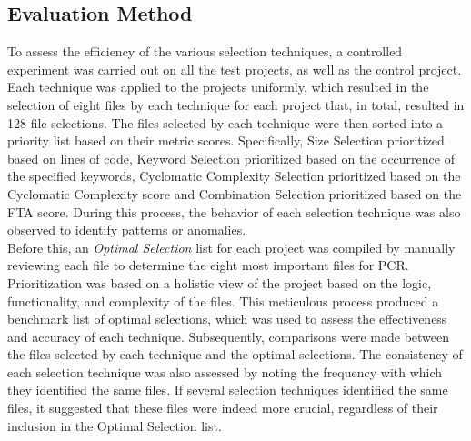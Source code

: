 \subsection{Evaluation Method}
To assess the efficiency of the various selection techniques, a controlled experiment was carried out on all the test projects, as well as the control project. Each technique was applied to the projects uniformly, which resulted in the selection of eight files by each technique for each project that, in total, resulted in 128 file selections. The files selected by each technique were then sorted into a priority list based on their metric scores. Specifically, Size Selection prioritized based on lines of code, Keyword Selection prioritized based on the occurrence of the specified keywords, Cyclomatic Complexity Selection prioritized based on the Cyclomatic Complexity score and Combination Selection prioritized based on the FTA score. During this process, the behavior of each selection technique was also observed to identify patterns or anomalies. \\

Before this, an \textit{Optimal Selection} list for each project was compiled by manually reviewing each file to determine the eight most important files for PCR. Prioritization was based on a holistic view of the project based on the logic, functionality, and complexity of the files. This meticulous process produced a benchmark list of optimal selections, which was used to assess the effectiveness and accuracy of each technique. Subsequently, comparisons were made between the files selected by each technique and the optimal selections. The consistency of each selection technique was also assessed by noting the frequency with which they identified the same files. If several selection techniques identified the same files, it suggested that these files were indeed more crucial, regardless of their inclusion in the Optimal Selection list.

